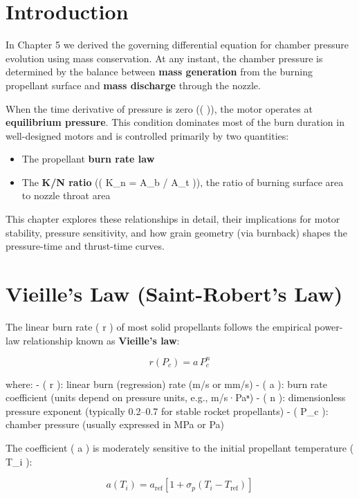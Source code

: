 \documentclass[
  letterpaper,
  DIV=11,
  numbers=noendperiod]{scrreprt}
\providecommand{\tightlist}{%
  \setlength{\itemsep}{0pt}\setlength{\parskip}{0pt}}
\begin{document}
\section{Introduction}\label{introduction-3}

In Chapter 5 we derived the governing differential equation for chamber
pressure evolution using mass conservation. At any instant, the chamber
pressure is determined by the balance between \textbf{mass generation}
from the burning propellant surface and \textbf{mass discharge} through
the nozzle.

When the time derivative of pressure is zero (( 
 )), the motor operates at \textbf{equilibrium pressure}. This
condition dominates most of the burn duration in well-designed motors
and is controlled primarily by two quantities:

\begin{itemize}
\tightlist
\item
  The propellant \textbf{burn rate law}
\item
  The \textbf{K/N ratio} (( K\_n = A\_b / A\_t )), the ratio of burning
  surface area to nozzle throat area
\end{itemize}

This chapter explores these relationships in detail, their implications
for motor stability, pressure sensitivity, and how grain geometry (via
burnback) shapes the pressure-time and thrust-time curves.

\section{Vieille's Law (Saint-Robert's
Law)}\label{vieilles-law-saint-roberts-law}

The linear burn rate ( r ) of most solid propellants follows the
empirical power-law relationship known as \textbf{Vieille's law}:

\[
r(P_c) = a \, P_c^n
\]

where: - ( r ): linear burn (regression) rate (m/s or mm/s) - ( a ):
burn rate coefficient (units depend on pressure units, e.g., m/s·Paⁿ) -
( n ): dimensionless pressure exponent (typically 0.2--0.7 for stable
rocket propellants) - ( P\_c ): chamber pressure (usually expressed in
MPa or Pa)

The coefficient ( a ) is moderately sensitive to the initial propellant
temperature ( T\_i ):

\[
a(T_i) = a_\text{ref} \left[1 + \sigma_p (T_i - T_\text{ref})\right]
\]
\end{document}
